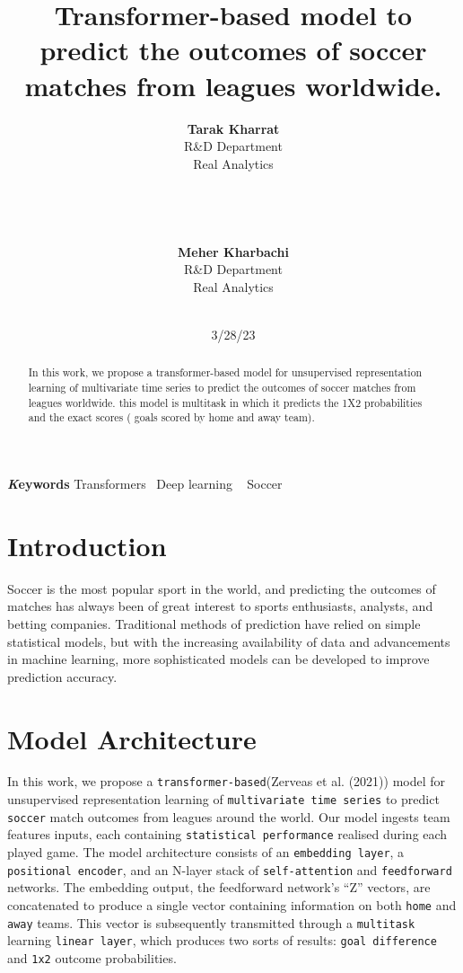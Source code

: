 \documentclass[
]{article}
\title{Transformer-based model to predict the outcomes of soccer matches
from leagues worldwide.}
\author{
\textbf{Tarak Kharrat}\\R\&D Department\\Real Analytics\\\\\\\\\\
\textbf{Meher Kharbachi}\\R\&D Department\\Real Analytics\\\\}
\date{3/28/23}
\begin{document}
\maketitle
\begin{abstract}
In this work, we propose a transformer-based model for unsupervised
representation learning of multivariate time series to predict the
outcomes of soccer matches from leagues worldwide. this model is
multitask in which it predicts the 1X2 probabilities and the exact
scores ( goals scored by home and away team).
\end{abstract}
{\bfseries \emph Keywords}
\def\sep{\textbullet\ }
Transformers \sep Deep learning \sep 
Soccer

\ifdefined\Shaded\renewenvironment{Shaded}{\begin{tcolorbox}[interior hidden, sharp corners, frame hidden, borderline west={3pt}{0pt}{shadecolor}, boxrule=0pt, breakable, enhanced]}{\end{tcolorbox}}\fi

\hypertarget{introduction}{%
\section{Introduction}\label{introduction}}

Soccer is the most popular sport in the world, and predicting the
outcomes of matches has always been of great interest to sports
enthusiasts, analysts, and betting companies. Traditional methods of
prediction have relied on simple statistical models, but with the
increasing availability of data and advancements in machine learning,
more sophisticated models can be developed to improve prediction
accuracy.

\hypertarget{model-architecture}{%
\section{Model Architecture}\label{model-architecture}}

In this work, we propose a \texttt{transformer-based}(Zerveas et al.
(2021)) model for unsupervised representation learning of
\texttt{multivariate\ time\ series} to predict \texttt{soccer} match
outcomes from leagues around the world. Our model ingests team features
inputs, each containing \texttt{statistical\ performance} realised
during each played game. The model architecture consists of an
\texttt{embedding\ layer}, a \texttt{positional\ encoder}, and an
N-layer stack of \texttt{self-attention} and \texttt{feedforward}
networks. The embedding output, the feedforward network's ``Z'' vectors,
are concatenated to produce a single vector containing information on
both \texttt{home} and \texttt{away} teams. This vector is subsequently
transmitted through a \texttt{multitask} learning
\texttt{linear\ layer}, which produces two sorts of results:
\texttt{goal\ difference} and \texttt{1x2} outcome probabilities.
\end{document}

